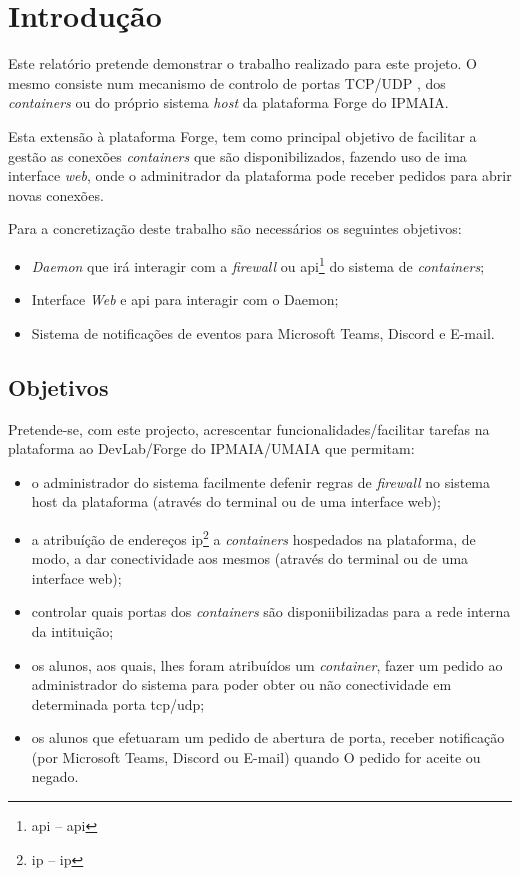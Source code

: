 \chapter{Introdução}
\label{chap:introduction}

Este relatório pretende demonstrar o trabalho realizado para este projeto.
O mesmo consiste num mecanismo de controlo de portas TCP/UDP \cite{rfc9293},
\cite{rfc768} dos \textit{containers} ou do próprio sistema \textit{host}
da plataforma Forge do IPMAIA.

Esta extensão à plataforma Forge, tem 
como principal objetivo de facilitar a gestão as conexões \textit{containers} 
que são disponibilizados, fazendo uso de ima interface \textit{web}, onde o adminitrador da 
plataforma pode receber pedidos para abrir novas conexões. 

Para a concretização deste trabalho são necessários os seguintes objetivos:\\

\begin{itemize}
\item \textit{Daemon} que irá interagir com a \textit{firewall} ou \acrshort{api}\footnote{\acrshort{api} -- \acrlong{api}} do sistema de \textit{containers};
\item Interface \textit{Web} e \acrshort{api} para interagir com o Daemon;
\item Sistema de notificações de eventos para Microsoft Teams, Discord e E-mail.
\end{itemize}


\section{Objetivos}
\label{sec:object}

Pretende-se, com este projecto, acrescentar funcionalidades/facilitar tarefas na plataforma ao
DevLab/Forge do IPMAIA/UMAIA que permitam:

\begin{itemize}
\item o administrador do sistema facilmente defenir regras de \textit{firewall} no sistema host da plataforma (através do terminal ou de uma interface web);
\item a atribuíção de endereços \acrshort{ip}\footnote{\acrshort{ip} -- \acrlong{ip}} a \textit{containers} hospedados na plataforma, de modo,
a dar conectividade aos mesmos (através do terminal ou de uma interface web);
\item controlar quais portas dos \textit{containers} são disponiibilizadas para a rede interna da intituição;
\item os alunos, aos quais, lhes foram atribuídos um \textit{container}, fazer um pedido ao administrador do sistema para poder
obter ou não conectividade em determinada porta \acrshort{tcp}/\acrshort{udp};
\item os alunos que efetuaram um pedido de abertura de porta, receber notificação (por Microsoft Teams, Discord ou E-mail) quando O
pedido for aceite ou negado.

\end{itemize}

